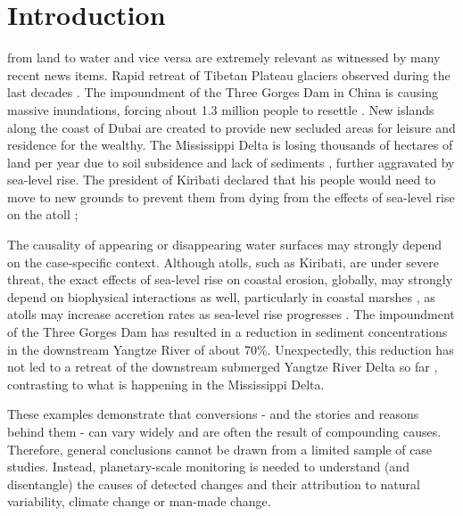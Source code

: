 \section{Introduction}
 from land to water and vice versa are extremely relevant as witnessed by many recent news items. Rapid retreat of Tibetan Plateau glaciers observed during the last decades \citet{chen2016changes}. The impoundment of the Three Gorges Dam in China is causing massive inundations, forcing about 1.3 million people to resettle \citet{Jackson2000}. New islands along the coast of Dubai are created to provide new secluded areas for leisure and residence for the wealthy. The Mississippi Delta is losing thousands of hectares of land per year due to soil subsidence and lack of sediments \citet{Giosan2014}, further aggravated by sea-level rise. The president of Kiribati declared that his people would need to move to new grounds to prevent them from dying from the effects of sea-level rise on the atoll \citet{Weiss2015}; 

The causality of appearing or disappearing water surfaces may strongly depend on the case‑specific context. Although atolls, such as Kiribati, are under severe threat, the exact effects of sea-level rise on coastal erosion, globally, may strongly depend on biophysical interactions as well, particularly in coastal marshes \citet{Storlazzi2015}, as atolls may increase accretion rates as sea-level rise progresses \citet{Kirwan2016}. The impoundment of the Three Gorges Dam has resulted in a reduction in sediment concentrations in the downstream Yangtze River of about 70\%. Unexpectedly, this reduction has not led to a retreat of the downstream submerged Yangtze River Delta so far \citet{Dai2014}, contrasting to what is happening in the Mississippi Delta.

These examples demonstrate that conversions - and the stories and reasons behind them - can vary widely and are often the result of compounding causes. Therefore, general conclusions cannot be drawn from a limited sample of case studies. Instead, planetary-scale monitoring is needed to understand (and disentangle) the causes of detected changes and their attribution to natural variability, climate change or man-made change. 

